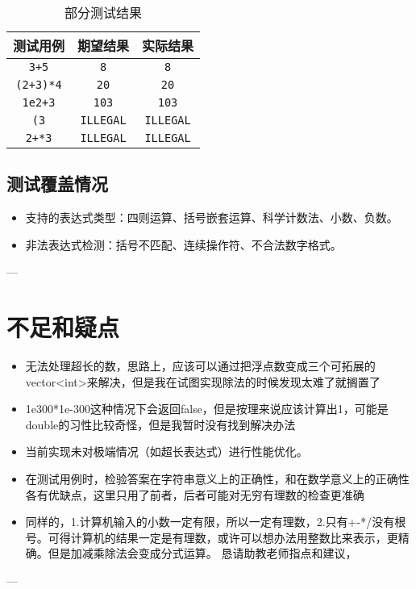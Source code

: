 \documentclass[12pt,a4paper]{article}
\begin{document}
\begin{table}[h!]
    \centering
    \begin{tabular}{|c|c|c|}
        \hline
        测试用例 & 期望结果 & 实际结果 \\
        \hline
        \texttt{3+5} & \texttt{8} & \texttt{8} \\
        \texttt{(2+3)*4} & \texttt{20} & \texttt{20} \\
        \texttt{1e2+3} & \texttt{103} & \texttt{103} \\
        \texttt{(3} & \texttt{ILLEGAL} & \texttt{ILLEGAL} \\
        \texttt{2+*3} & \texttt{ILLEGAL} & \texttt{ILLEGAL} \\
        \hline
    \end{tabular}
    \caption{部分测试结果}
    \label{tab:testResults}
\end{table}

\subsection{测试覆盖情况}
\begin{itemize}
    \item 支持的表达式类型：四则运算、括号嵌套运算、科学计数法、小数、负数。
    \item 非法表达式检测：括号不匹配、连续操作符、不合法数字格式。
\end{itemize}

---

\section{不足和疑点}
\begin{itemize}
    \item 无法处理超长的数，思路上，应该可以通过把浮点数变成三个可拓展的vector<int>来解决，但是我在试图实现除法的时候发现太难了就搁置了
    \item 1e300*1e-300这种情况下会返回false，但是按理来说应该计算出1，可能是double的习性比较奇怪，但是我暂时没有找到解决办法
    \item 当前实现未对极端情况（如超长表达式）进行性能优化。
    \item 在测试用例时，检验答案在字符串意义上的正确性，和在数学意义上的正确性各有优缺点，这里只用了前者，后者可能对无穷有理数的检查更准确
    \item 同样的，1.计算机输入的小数一定有限，所以一定有理数，2.只有+-*/没有根号。可得计算机的结果一定是有理数，或许可以想办法用整数比来表示，更精确。但是加减乘除法会变成分式运算。
    恳请助教老师指点和建议，
\end{itemize}


---
\end{document}
